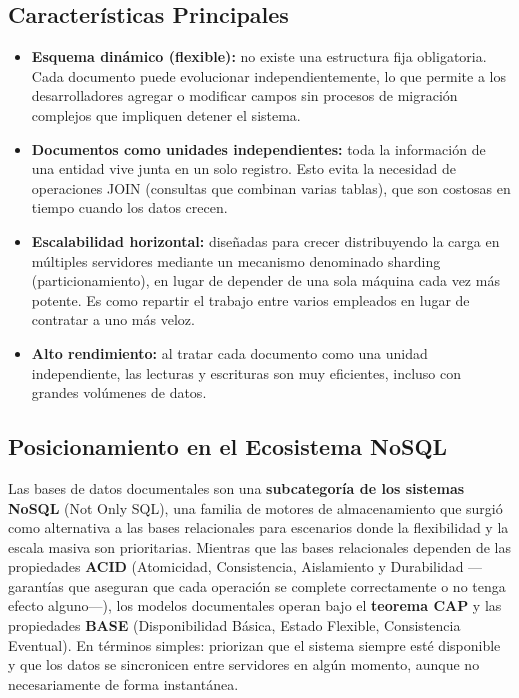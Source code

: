 \documentclass[conference]{IEEEtran}
\begin{document}
\subsection{Características Principales}
\begin{itemize}
    \item \textbf{Esquema dinámico (flexible):} no existe una estructura fija obligatoria. Cada documento puede evolucionar independientemente, lo que permite a los desarrolladores agregar o modificar campos sin procesos de migración complejos que impliquen detener el sistema.
    \item \textbf{Documentos como unidades independientes:} toda la información de una entidad vive junta en un solo registro. Esto evita la necesidad de operaciones JOIN (consultas que combinan varias tablas), que son costosas en tiempo cuando los datos crecen.
    \item \textbf{Escalabilidad horizontal:} diseñadas para crecer distribuyendo la carga en múltiples servidores mediante un mecanismo denominado sharding (particionamiento), en lugar de depender de una sola máquina cada vez más potente. Es como repartir el trabajo entre varios empleados en lugar de contratar a uno más veloz.
    \item \textbf{Alto rendimiento:} al tratar cada documento como una unidad independiente, las lecturas y escrituras son muy eficientes, incluso con grandes volúmenes de datos.
\end{itemize}

\subsection{Posicionamiento en el Ecosistema NoSQL}
Las bases de datos documentales son una \textbf{subcategoría de los sistemas NoSQL} (Not Only SQL), una familia de motores de almacenamiento que surgió como alternativa a las bases relacionales para escenarios donde la flexibilidad y la escala masiva son prioritarias. Mientras que las bases relacionales dependen de las propiedades \textbf{ACID} (Atomicidad, Consistencia, Aislamiento y Durabilidad —garantías que aseguran que cada operación se complete correctamente o no tenga efecto alguno—), los modelos documentales operan bajo el \textbf{teorema CAP} y las propiedades \textbf{BASE} (Disponibilidad Básica, Estado Flexible, Consistencia Eventual). En términos simples: priorizan que el sistema siempre esté disponible y que los datos se sincronicen entre servidores en algún momento, aunque no necesariamente de forma instantánea.
\end{document}
